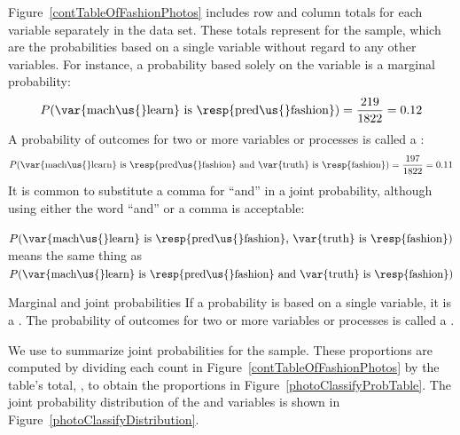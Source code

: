 
Figure~\ref{contTableOfFashionPhotos} includes row and
column totals for each variable separately in the
 data set.
These totals represent
for the sample, which are the probabilities based on a
single variable without regard to any other variables.
For instance, a probability based solely on the
 variable is a marginal probability:
\begin{align*}
P(\text{\var{mach\us{}learn} is \resp{pred\us{}fashion}})
    = \frac{\fashYA{}}{\fashN{}}
    = 0.12
\end{align*}
A probability of outcomes for two or more variables
or processes is called a
:
\begin{align*}
P(\text{\var{mach\us{}learn} is \resp{pred\us{}fashion}
    and \var{truth} is \resp{fashion}})
  = \frac{\fashYY{}}{\fashN{}}
  = 0.11
\end{align*}
It is common to substitute a comma for ``and'' in a joint
probability, although using either the word ``and'' or a
comma is acceptable:
\begin{center}
$P(\text{\var{mach\us{}learn} is \resp{pred\us{}fashion},
    \var{truth} is \resp{fashion}})$ \\[2mm]
means the same thing as \\[2mm]
$P(\text{\var{mach\us{}learn} is \resp{pred\us{}fashion}
    and \var{truth} is \resp{fashion}})$
\end{center}

\begin{onebox}{Marginal and joint probabilities}
  If a probability is based on a single variable,
  it is a \emph{}.
  The probability of outcomes for two or more variables
  or processes is called a \emph{}.
\end{onebox}

We use  to summarize joint probabilities
for the  sample.
These proportions are computed by dividing each count in
Figure~\ref{contTableOfFashionPhotos} by the table's total,
\fashN{}, to obtain the proportions in
Figure~\ref{photoClassifyProbTable}.
The joint probability distribution of the 
and  variables is shown in
Figure~\ref{photoClassifyDistribution}.

